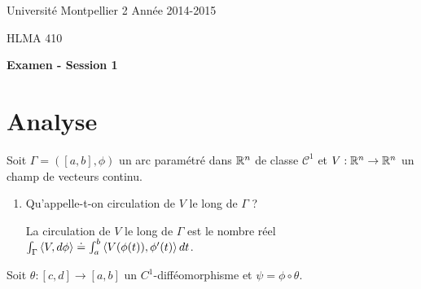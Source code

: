 \documentclass{article}
\begin{document}
\noindent Université Montpellier 2 \hfill Année 2014-2015

\noindent HLMA 410
 


\bigskip

\begin{center}
{\large \sffamily\bfseries Examen - Session 1}
\end{center}

\bigskip
\bigskip

\section{Analyse}

	Soit $\Gamma=([a,b],\phi)$ un arc param\'etr\'e dans $\mathbb{R}^n$ de classe $\mathcal C^1$ et $V:\mathbb{R}^n \rightarrow \mathbb{R}^n$ un champ de vecteurs continu.
\begin{enumerate}
	\item Qu'appelle-t-on circulation de $V$ le long de $\Gamma$ ?

	\medskip

		La circulation de $V$ le long de $\Gamma$ est le nombre réel $\int_{\Gamma} \left\langle V,d\phi\right\rangle \doteq \int_a^b \left\langle V(\phi(t)),\phi'(t)\right\rangle dt$.

	\medskip

\end{enumerate}
			Soit $\theta: [c,d] \rightarrow [a,b]$ un $C^1$-diff\'eomorphisme et $\psi=\phi \circ \theta$. 
\end{document}
